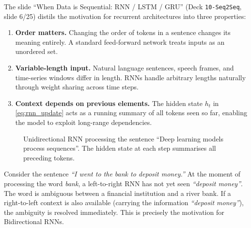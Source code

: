 \documentclass[12pt,a4paper]{article}
\begin{document}
The slide ``When Data is Sequential: RNN / LSTM / GRU'' (Deck \texttt{10-Seq2Seq},
slide 6/25) distils the motivation for recurrent architectures into three
properties:

\begin{enumerate}[label=\textbf{P\arabic*.}]
  \item \textbf{Order matters.}  Changing the order of tokens in a sentence
        changes its meaning entirely.  A standard feed-forward network treats
        inputs as an unordered set.
  \item \textbf{Variable-length input.}  Natural language sentences, speech
        frames, and time-series windows differ in length.  RNNs handle arbitrary
        lengths naturally through weight sharing across time steps.
  \item \textbf{Context depends on previous elements.}  The hidden state
        $h_t$ in \cref{eq:rnn_update} acts as a running summary of all tokens
        seen so far, enabling the model to exploit long-range dependencies.
\end{enumerate}

\begin{figure}[h]
\centering
{}
\caption{Unidirectional RNN processing the sentence
         ``Deep learning models process sequences''.  The hidden state at each
         step summarises all preceding tokens.}
\label{fig:unidirectional_rnn}
\end{figure}

\begin{example}[title=Ambiguity Resolution with Context]
  Consider the sentence \emph{``I went to the bank to deposit money.''}
  At the moment of processing the word \emph{bank}, a left-to-right RNN
  has not yet seen \emph{``deposit money''}.  The word is ambiguous between
  a financial institution and a river bank.  If a right-to-left context is
  also available (carrying the information \emph{``deposit money''}), the
  ambiguity is resolved immediately.  This is precisely the motivation for
  Bidirectional RNNs.
\end{example}
\end{document}
